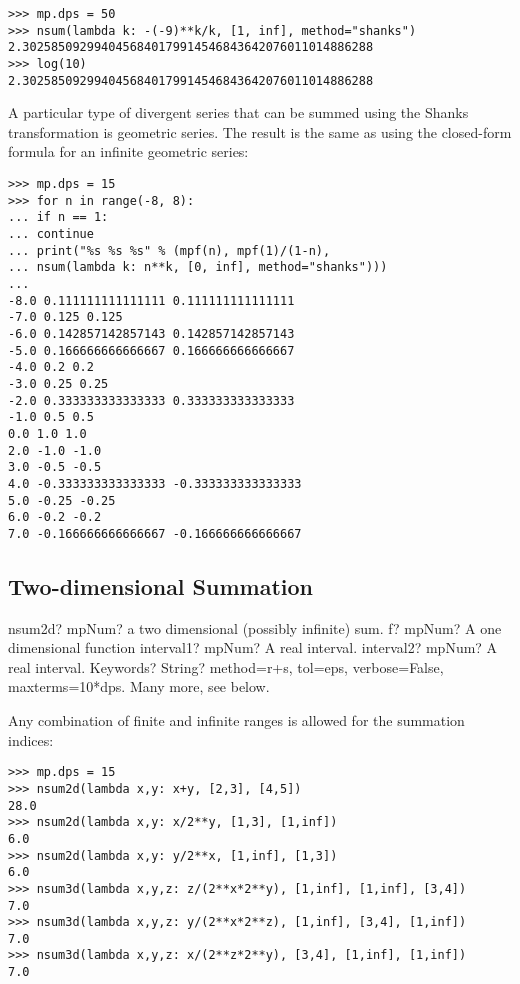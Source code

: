 \begin{lstlisting}
>>> mp.dps = 50
>>> nsum(lambda k: -(-9)**k/k, [1, inf], method="shanks")
2.3025850929940456840179914546843642076011014886288
>>> log(10)
2.3025850929940456840179914546843642076011014886288
\end{lstlisting}

A particular type of divergent series that can be summed using the Shanks
transformation is geometric series. The result is the same as using the closed-form formula for an infinite geometric series:

\begin{lstlisting}
>>> mp.dps = 15
>>> for n in range(-8, 8):
... if n == 1:
... continue
... print("%s %s %s" % (mpf(n), mpf(1)/(1-n),
... nsum(lambda k: n**k, [0, inf], method="shanks")))
...
-8.0 0.111111111111111 0.111111111111111
-7.0 0.125 0.125
-6.0 0.142857142857143 0.142857142857143
-5.0 0.166666666666667 0.166666666666667
-4.0 0.2 0.2
-3.0 0.25 0.25
-2.0 0.333333333333333 0.333333333333333
-1.0 0.5 0.5
0.0 1.0 1.0
2.0 -1.0 -1.0
3.0 -0.5 -0.5
4.0 -0.333333333333333 -0.333333333333333
5.0 -0.25 -0.25
6.0 -0.2 -0.2
7.0 -0.166666666666667 -0.166666666666667
\end{lstlisting}

%


\subsection{Two-dimensional Summation}


\begin{mpFunctionsExtract}
	\mpFunctionFour
	{nsum2d? mpNum? a two dimensional (possibly infinite) sum.}
	{f? mpNum? A one dimensional function}
	{interval1? mpNum? A real interval.}	
	{interval2? mpNum? A real interval.}		
	{Keywords? String? method=r+s, tol=eps, verbose=False, maxterms=10*dps. Many more, see below.}	
\end{mpFunctionsExtract}


\vpara
Any combination of finite and infinite ranges is allowed for the summation indices:

\begin{lstlisting}
>>> mp.dps = 15
>>> nsum2d(lambda x,y: x+y, [2,3], [4,5])
28.0
>>> nsum2d(lambda x,y: x/2**y, [1,3], [1,inf])
6.0
>>> nsum2d(lambda x,y: y/2**x, [1,inf], [1,3])
6.0
>>> nsum3d(lambda x,y,z: z/(2**x*2**y), [1,inf], [1,inf], [3,4])
7.0
>>> nsum3d(lambda x,y,z: y/(2**x*2**z), [1,inf], [3,4], [1,inf])
7.0
>>> nsum3d(lambda x,y,z: x/(2**z*2**y), [3,4], [1,inf], [1,inf])
7.0
\end{lstlisting}

